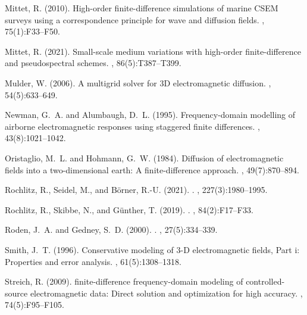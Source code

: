 \documentclass[a4paper,10pt]{article}
\begin{document}
\begin{thebibliography}{}
Mittet, R. (2010).
\newblock High-order finite-difference simulations of marine {CSEM} surveys
  using a correspondence principle for wave and diffusion fields.
, 75(1):F33--F50.

Mittet, R. (2021).
\newblock Small-scale medium variations with high-order finite-difference and
  pseudospectral schemes.
, 86(5):T387--T399.

Mulder, W. (2006).
\newblock A multigrid solver for 3{D} electromagnetic diffusion.
, 54(5):633--649.

Newman, G.~A. and Alumbaugh, D.~L. (1995).
\newblock Frequency-domain modelling of airborne electromagnetic responses
  using staggered finite differences.
, 43(8):1021--1042.

Oristaglio, M.~L. and Hohmann, G.~W. (1984).
\newblock Diffusion of electromagnetic fields into a two-dimensional earth: A
  finite-difference approach.
, 49(7):870--894.

Rochlitz, R., Seidel, M., and Börner, R.-U. (2021).
.
, 227(3):1980--1995.

Rochlitz, R., Skibbe, N., and G{\"u}nther, T. (2019).
.
, 84(2):F17--F33.

Roden, J.~A. and Gedney, S.~D. (2000).
.
, 27(5):334--339.

Smith, J.~T. (1996).
\newblock Conservative modeling of 3-{D} electromagnetic fields, {P}art i:
  Properties and error analysis.
, 61(5):1308--1318.

Streich, R. (2009).
 finite-difference frequency-domain modeling of controlled-source
  electromagnetic data: {D}irect solution and optimization for high accuracy.
, 74(5):F95--F105.


\end{thebibliography}
\end{document}
